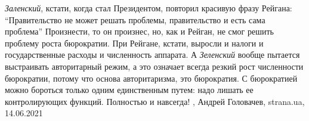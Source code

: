 \emph{Заленский}, кстати, когда стал Президентом, повторил красивую фразу Рейгана:
\enquote{Правительство не может решать проблемы, правительство и есть сама
проблема} Произнести, то он произнес, но, как и Рейган, не смог решить проблему
роста бюрократии. При Рейгане, кстати, выросли и налоги и государственные
расходы и численность аппарата. А \emph{Зеленский} вообще пытается выстраивать
авторитарный режим, а это означает всегда резкий рост численности бюрократии,
потому что основа авторитаризма, это бюрократия. С бюрократией можно бороться
только одним единственным путем: надо лишать ее контролирующих функций.
Полностью и навсегда!
, 
Андрей Головачев, strana.ua, 14.06.2021


